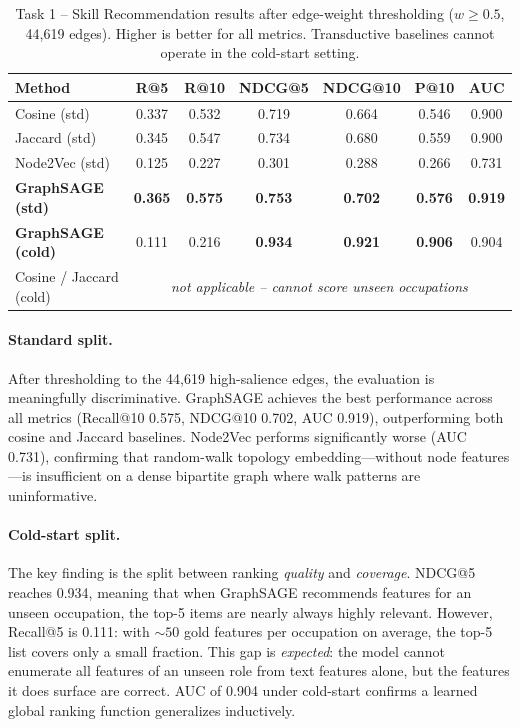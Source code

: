 \documentclass{article}
\begin{document}
\begin{table}[h]
\centering
\caption{Task 1 -- Skill Recommendation results after edge-weight thresholding
  ($w\!\geq\!0.5$, 44{,}619 edges).
  Higher is better for all metrics.
  Transductive baselines cannot operate in the cold-start setting.}
\label{tab:task1}
\small
\begin{tabular}{lcccccc}
\toprule
Method & R@5 & R@10 & NDCG@5 & NDCG@10 & P@10 & AUC \\
\midrule
Cosine (std)       & 0.337 & 0.532 & 0.719 & 0.664 & 0.546 & 0.900 \\
Jaccard (std)      & 0.345 & 0.547 & 0.734 & 0.680 & 0.559 & 0.900 \\
Node2Vec (std)     & 0.125 & 0.227 & 0.301 & 0.288 & 0.266 & 0.731 \\
\textbf{GraphSAGE (std)}  & \textbf{0.365} & \textbf{0.575} & \textbf{0.753} & \textbf{0.702} & \textbf{0.576} & \textbf{0.919} \\
\midrule
\textbf{GraphSAGE (cold)} & 0.111 & 0.216 & \textbf{0.934} & \textbf{0.921} & \textbf{0.906} & 0.904 \\
Cosine / Jaccard (cold) & \multicolumn{6}{c}{\textit{not applicable -- cannot score unseen occupations}} \\
\bottomrule
\end{tabular}
\end{table}

\paragraph{Standard split.}
After thresholding to the 44,619 high-salience edges, the evaluation is
meaningfully discriminative.
GraphSAGE achieves the best performance across all metrics
(Recall@10 0.575, NDCG@10 0.702, AUC 0.919), outperforming both cosine and
Jaccard baselines.
Node2Vec performs significantly worse (AUC 0.731), confirming that
random-walk topology embedding---without node features---is insufficient on a
dense bipartite graph where walk patterns are uninformative.

\paragraph{Cold-start split.}
The key finding is the split between ranking \emph{quality} and
\emph{coverage}.
NDCG@5 reaches 0.934, meaning that when GraphSAGE recommends features for
an unseen occupation, the top-5 items are nearly always highly relevant.
However, Recall@5 is 0.111: with $\sim\!50$ gold features per occupation on
average, the top-5 list covers only a small fraction.
This gap is \emph{expected}: the model cannot enumerate all features of an
unseen role from text features alone, but the features it does surface are
correct.
AUC of 0.904 under cold-start confirms a learned global ranking function
generalizes inductively.
\end{document}
